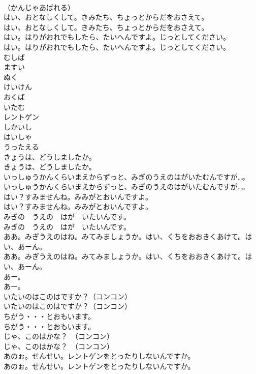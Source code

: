 \documentclass[8pt]{extreport}
\begin{document}
\begin{CJK}{UTF8}{min}
\\	（かんじゃあばれる）
\\	はい、おとなしくして。きみたち、ちょっとからだをおさえて。
\\	はい、おとなしくして。きみたち、ちょっとからだをおさえて。
\\	はい。はりがおれでもしたら、たいへんですよ。じっとしてください。
\\	はい。はりがおれでもしたら、たいへんですよ。じっとしてください。
\\	むしば
\\	ますい
\\	ぬく
\\	けいけん
\\	おくば
\\	いたむ
\\	レントゲン
\\	しかいし
\\	はいしゃ
\\	うったえる
\\	きょうは、どうしましたか。
\\	きょうは、どうしましたか。
\\	いっしゅうかんくらいまえからずっと、みぎのうえのはがいたむんですが…。
\\	いっしゅうかんくらいまえからずっと、みぎのうえのはがいたむんですが…。
\\	はい？すみませんね。みみがとおいんですよ。
\\	はい？すみませんね。みみがとおいんですよ。
\\	みぎの　うえの　はが　いたいんです。
\\	みぎの　うえの　はが　いたいんです。
\\	ああ。みぎうえのはね。みてみましょうか。はい、くちをおおきくあけて。はい、あーん。
\\	ああ。みぎうえのはね。みてみましょうか。はい、くちをおおきくあけて。はい、あーん。
\\	あー。
\\	あー。
\\	いたいのはこのはですか？（コンコン）
\\	いたいのはこのはですか？（コンコン）
\\	ちがう・・・とおもいます。
\\	ちがう・・・とおもいます。
\\	じゃ、このはかな？　（コンコン）
\\	じゃ、このはかな？　（コンコン）
\\	あのぉ。せんせい。レントゲンをとったりしないんですか。
\\	あのぉ。せんせい。レントゲンをとったりしないんですか。

\end{CJK}
\end{document}
